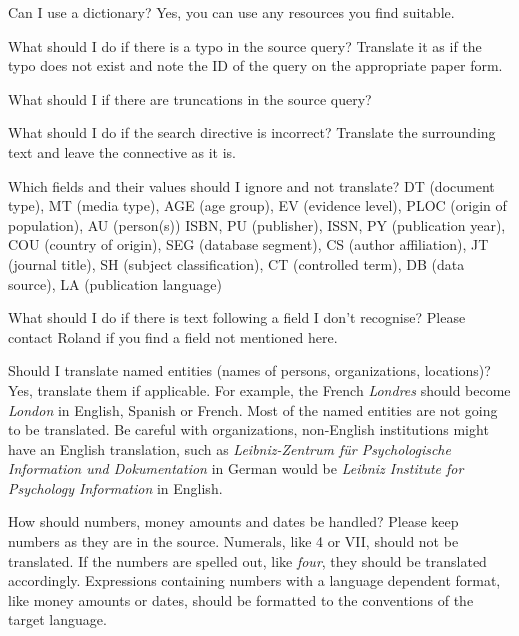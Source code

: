\documentclass[a4paper,10pt]{article}
\newenvironment{faq}{\begin{description}[style=nextline]}{\end{description}}
\newcommand{\cris}[1]{{\color{red}{#1}}}
\begin{document}
\begin{faq}

  \item[Can I use a dictionary?]
 Yes, you can use any resources you find suitable.
  
  \item[What should I do if there is a typo in the source query?]
    Translate it as if the typo does not exist and note the ID of the query on the appropriate paper form.

  \item[What should I if there are truncations in the source query?]
\cris{RR: No idea. Report it, so we can deal with this later?!}

  \item[What should I do if the search directive is incorrect?]
    Translate the surrounding text and leave the connective as it is. \cris{RR: what would be an example for that case?}
    
  \item[Which fields and their values should I ignore and not translate?]
  DT (document type), MT (media type), AGE (age group), EV (evidence level), PLOC (origin of population), AU (person(s))
  ISBN, PU (publisher), ISSN, PY (publication year), COU (country of origin), SEG (database segment), CS (author affiliation), JT (journal title), SH (subject classification), CT (controlled term), DB (data source), LA (publication language)
  
  \item[What should I do if there is text following a field I don't recognise?]
    Please contact Roland if you find a field not mentioned here.
    
  \item[Should I translate named entities (names of persons, organizations, locations)?]
Yes, translate them if applicable. For example, the French \textit{Londres} should become \textit{London} in English, Spanish or French. Most of the named entities are not going to be translated. Be careful with organizations, non-English institutions might have an English translation, such as \textit{Leibniz-Zentrum f\"ur Psychologische Information und Dokumentation} in German would be \textit{Leibniz Institute for Psychology Information} in English. 

\item[How should numbers, money amounts and dates be handled?]
Please keep numbers as they are in the source. Numerals, like 4 or VII, should not be translated. If the numbers are spelled out, like \emph{four}, they should be translated accordingly. Expressions containing numbers with a language dependent format, like money amounts or dates, should be formatted to the conventions of the target language.
    
\end{faq}
\end{document}
